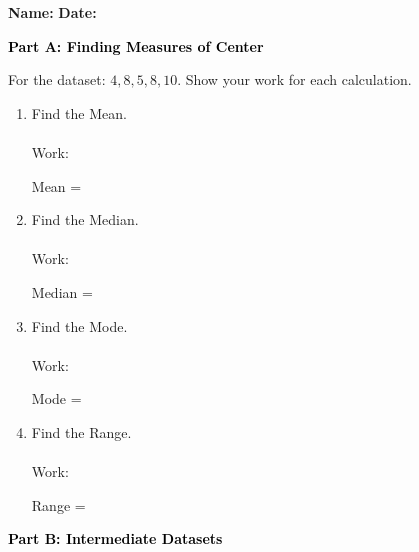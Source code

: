 \documentclass[12pt, letterpaper, fleqn]{article}
\newcommand{\blank}{\underline{\hspace{2.2cm}}}
\begin{document}
\textbf{Name:} \underline{\hspace{5cm}}
\hfill
\textbf{Date:} \underline{\hspace{3cm}}\\

\begin{tcolorbox}[colback=black!10]
    \large\textcolor{black}{\textbf{Part A: Finding Measures of Center}}
\end{tcolorbox}

\vspace{3mm}

\noindent
For the dataset: $4, 8, 5, 8, 10$. Show your work for each calculation.

\vspace{5mm}

\begin{enumerate}[itemsep=1.0cm, leftmargin=0.6cm]
\item Find the Mean. \\ \\
Work: \quad  
\vspace{1cm}

Mean = \blank

\item Find the Median. \\ \\
Work: \quad  
\vspace{1cm}

Median = \blank

\item Find the Mode. \\ \\
Work: \quad  
\vspace{1cm}

Mode = \blank

\item Find the Range. \\ \\
Work: \quad  
\vspace{1cm}

Range = \blank
\end{enumerate}

\newpage

\begin{tcolorbox}[colback=black!10]
    \large\textcolor{black}{\textbf{Part B: Intermediate Datasets}}
\end{tcolorbox}
\end{document}
